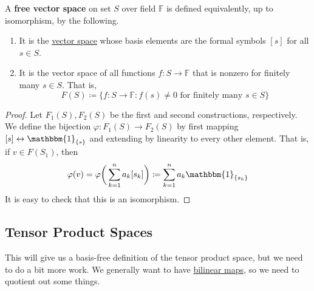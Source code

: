 	\begin{definition}
	  \label{def:free-vector-space}
		A \textbf{free vector space} on set $S$ over field $\mathbb{F}$ is defined equivalently, up to isomorphism, by the following. 
		\begin{enumerate}
			\item It is the \hyperref[def:vector-space]{vector space} whose basis elements are the formal symbols $[s]$ for all $s \in S$. 

		  \item It is the vector space of all functions $f: S \to \mathbb{F}$ that is nonzero for finitely many $s \in S$. That is, 
				\begin{equation}
					F(S) \coloneqq \{ f : S \to \mathbb{F} \colon f(s) \neq 0 \text{ for finitely many } s \in S \}
				\end{equation}
		\end{enumerate}
	\end{definition}
	\begin{proof}
		Let $F_1 (S), F_2(S)$ be the first and second constructions, respectively. We define the bijection $\varphi: F_1 (S) \to F_2 (S)$ by first mapping $[s] \leftrightarrow \mathbbm{1}_{\{s\}}$ and extending by linearity to every other element. That is, if $v \in F(S_1)$, then 
		\begin{equation}
			\varphi(v) = \varphi \bigg( \sum_{k=1}^n a_k [s_k] \bigg) \coloneqq \sum_{k=1}^n a_k \mathbbm{1}_{\{s_k\}}
		\end{equation}
		It is easy to check that this is an isomorphism. 
	\end{proof}

\subsection{Tensor Product Spaces}

	This will give us a basis-free definition of the tensor product space, but we need to do a bit more work. We generally want to have \hyperref[def:bilinear-map]{bilinear maps}, so we need to quotient out some things. 

